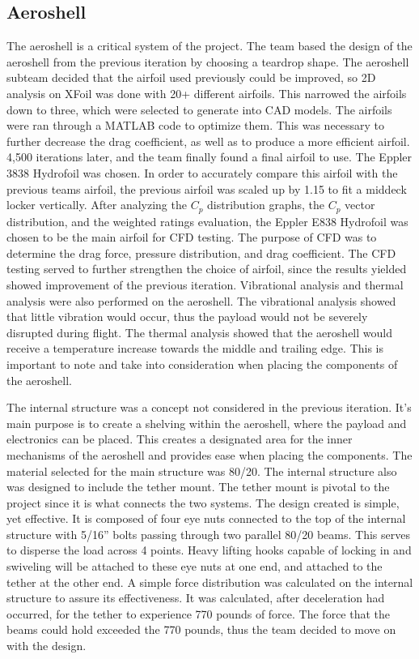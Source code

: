 \subsection{Aeroshell}

\indent\indent The aeroshell is a critical system of the project. The team based the design of the aeroshell from the previous iteration by choosing a teardrop shape. The aeroshell subteam decided that the airfoil used previously could be improved, so 2D analysis on XFoil was done with 20+ different airfoils. This narrowed the airfoils down to three, which were selected to generate into CAD models. The airfoils were ran through a MATLAB code to optimize them. This was necessary to further decrease the drag coefficient, as well as to produce a more efficient airfoil. 4,500 iterations later, and the team finally found a final airfoil to use. The Eppler 3838 Hydrofoil was chosen. In order to accurately compare this airfoil with the previous teams airfoil, the previous airfoil was scaled up by 1.15 to fit a middeck locker vertically. After analyzing the $C_p$ distribution graphs, the $C_p$ vector distribution, and the weighted ratings evaluation, the Eppler E838 Hydrofoil was chosen to be the main airfoil for CFD testing. The purpose of CFD was to determine the drag force, pressure distribution, and drag coefficient. The CFD testing served to further strengthen the choice of airfoil, since the results yielded showed improvement of the previous iteration. Vibrational analysis and thermal analysis were also performed on the aeroshell. The vibrational analysis showed that little vibration would occur, thus the payload would not be severely disrupted during flight. The thermal analysis showed that the aeroshell would receive a temperature increase towards the middle and trailing edge. This is important to note and take into consideration when placing the components of the aeroshell. 

\indent\indent The internal structure was a concept not considered in the previous iteration. It’s main purpose is to create a shelving within the aeroshell, where the payload and electronics can be placed. This creates a designated area for the inner mechanisms of the aeroshell and provides ease when placing the components. The material selected for the main structure was 80/20. The internal structure also was designed to include the tether mount. The tether mount is pivotal to the project since it is what connects the two systems. The design created is simple, yet effective. It is composed of four eye nuts connected to the top of the internal structure with 5/16” bolts passing through two parallel 80/20 beams. This serves to disperse the load across 4 points. Heavy lifting hooks capable of locking in and swiveling will be attached to these eye nuts at one end, and attached to the tether at the other end. A simple force distribution was calculated on the internal structure to assure its effectiveness. It was calculated, after deceleration had occurred, for the tether to experience 770 pounds of force. The force that the beams could hold exceeded the 770 pounds, thus the team decided to move on with the design.

